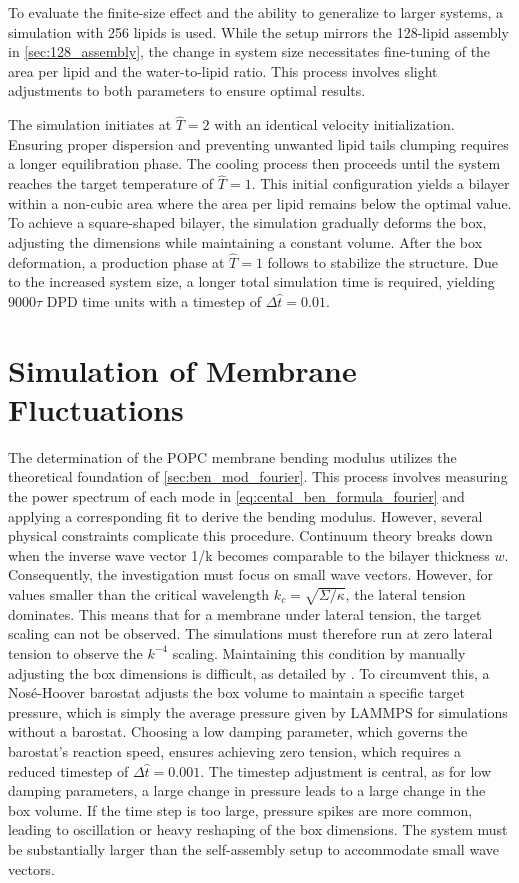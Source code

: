 \documentclass[
    11pt,
    a4paper,
    oneside,        %
    BCOR=10mm,      %
    parskip=half,   %
    listof=nototoc,   %
    bibliography=totoc %
]{scrreprt}
\begin{document}
To evaluate the finite-size effect and the ability to generalize to larger systems, a simulation with 256 lipids is used. While the setup mirrors the 128-lipid assembly in \cref{sec:128_assembly}, the change in system size necessitates fine-tuning of the area per lipid and the water-to-lipid ratio. This process involves slight adjustments to both parameters to ensure optimal results.

The simulation initiates at $\hat{T} = 2$ with an identical velocity initialization. Ensuring proper dispersion and preventing unwanted lipid tails clumping requires a longer equilibration phase. The cooling process then proceeds until the system reaches the target temperature of $\hat{T} = 1$. This initial configuration yields a bilayer within a non-cubic area where the area per lipid remains below the optimal value. To achieve a square-shaped bilayer, the simulation gradually deforms the box, adjusting the dimensions while maintaining a constant volume. After the box deformation, a production phase at $\hat{T} = 1$ follows to stabilize the structure. Due to the increased system size, a longer total simulation time is required, yielding $9000\tau$ DPD time units with a timestep of $\Delta \hat{t} = 0.01$. 

\section{Simulation of Membrane Fluctuations}\label{sec:method_ben_mod_fourier}

The determination of the POPC membrane bending modulus utilizes the theoretical foundation of \cref{sec:ben_mod_fourier}. This process involves measuring the power spectrum of each mode in \cref{eq:cental_ben_formula_fourier} and applying a corresponding fit to derive the bending modulus. However, several physical constraints complicate this procedure. Continuum theory breaks down when the inverse wave vector 1/k becomes comparable to the bilayer thickness $w$. Consequently, the investigation must focus on small wave vectors. However, for values smaller than the critical wavelength $k_c = \sqrt{\Sigma/\kappa}$, the lateral tension dominates. This means that for a membrane under lateral tension, the target scaling can not be observed. The simulations must therefore run at zero lateral tension to observe  the $k^{-4}$ scaling. Maintaining this condition by manually adjusting the box dimensions is difficult, as detailed by \citeauthor{Cooke_bending_mod} \cite{Cooke_bending_mod}. To circumvent this, a Nosé-Hoover barostat \cite{nose_base_paper,martyna_barostat,LammpsNPH} adjusts the box volume to maintain a specific target pressure, which is simply the average pressure given by LAMMPS for simulations without a barostat. Choosing a low damping parameter, which governs the barostat's reaction speed, ensures achieving zero tension, which requires a reduced timestep of $\Delta \hat{t} = 0.001$. The timestep adjustment is central, as for low damping parameters, a large change in pressure leads to a large change in the box volume. If the time step is too large, pressure spikes are more common, leading to oscillation or heavy reshaping of the box dimensions. The system must be substantially larger than the self-assembly setup to accommodate small wave vectors.
\end{document}
